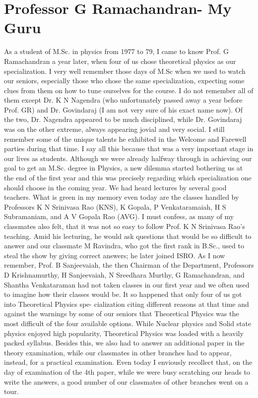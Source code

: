 \chapter[Professor G Ramachandran- My Guru]{Professor G Ramachandran- My Guru}\label{chap15}

As a student of M.Sc. in physics from 1977 to 79, I came to know Prof. G Ramachandran a year later, when four of us chose theoretical physics as our specialization. I very well remember those days of M.Sc when we used to watch our seniors, especially those who chose the same specialization, expecting some clues from them on how to tune ourselves for the course. I do not remember all of them except Dr. K N Nagendra (who unfortunately passed away a year before Prof. GR) and Dr. Govindaraj (I am not very sure of his exact name now). Of the two, Dr. Nagendra appeared to be much disciplined, while Dr. Govindaraj was on the other extreme, always appearing jovial and very social. I still remember some of the unique talents he exhibited in the Welcome and Farewell parties during that time. I say all this because that was a very important stage in our lives as students. Although we were already halfway through in achieving our goal to get an M.Sc. degree in Physics, a new dilemma started bothering us at the end of the first year and this was precisely regarding which specialization one should choose in the coming year. We had heard lectures by several good teachers. What is green in my memory even today are the classes handled by Professors K N Srinivasa Rao (KNS), K Gopala, P Venkataramaiah, H S Subramaniam, and A V Gopala Rao (AVG). I must confess, as many of my classmates also felt, that it was not so easy to follow Prof. K N Srinivasa Rao's teaching. Amid his lecturing, he would ask questions that would be so difficult to answer and our classmate M Ravindra, who got the first rank in B.Sc., used to steal the show by giving correct answers; he later joined ISRO. As I now remember, Prof. B Sanjeevaiah, the then Chairman of the Department, Professors D Krishnamurthy, H Sanjeevaiah, N Sreedhara Murthy, G Ramachandran, and Shantha Venkataraman had not taken classes in our first year and we often used to imagine how their classes would be. It so happened that only four of us got into Theoretical Physics spe- cialization citing different reasons at that time and against the warnings by some of our seniors that Theoretical Physics was the most difficult of the four available options. While Nuclear physics and Solid state physics enjoyed high popularity, Theoretical Physics was loaded with a heavily packed syllabus. Besides this, we also had to answer an additional paper in the theory examination, while our classmates in other branches had to appear, instead, for a practical examination. Even today I enviously recollect that, on the day of examination of the 4th paper, while we were busy scratching our heads to write the answers, a good number of our classmates of other branches went on a tour.

